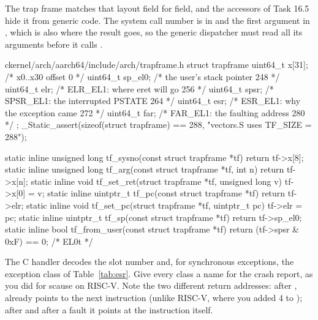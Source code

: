 \documentclass[11pt,a4paper]{article}
\begin{document}
The trap frame matches that layout field for field, and the accessors of Task 16.5 hide it from generic code.
The system call number is in  and the first argument in , which is also where the result goes, so
the generic dispatcher must read all its arguments before it calls .

\begin{lst}{c}{kernel/arch/aarch64/include/arch/trapframe.h}
struct trapframe {
    uint64_t x[31];             /* x0..x30                     offset   0 */
    uint64_t sp_el0;            /* the user's stack pointer           248 */
    uint64_t elr;               /* ELR_EL1: where eret will go        256 */
    uint64_t spsr;              /* SPSR_EL1: the interrupted PSTATE   264 */
    uint64_t esr;               /* ESR_EL1: why the exception came    272 */
    uint64_t far;               /* FAR_EL1: the faulting address      280 */
};
_Static_assert(sizeof(struct trapframe) == 288, "vectors.S uses TF_SIZE = 288");

static inline unsigned long tf_sysno(const struct trapframe *tf)         { return tf->x[8]; }
static inline unsigned long tf_arg(const struct trapframe *tf, int n)    { return tf->x[n]; }
static inline void tf_set_ret(struct trapframe *tf, unsigned long v)     { tf->x[0] = v; }
static inline uintptr_t tf_pc(const struct trapframe *tf)                { return tf->elr; }
static inline void tf_set_pc(struct trapframe *tf, uintptr_t pc)         { tf->elr = pc; }
static inline uintptr_t tf_sp(const struct trapframe *tf)                { return tf->sp_el0; }
static inline bool tf_from_user(const struct trapframe *tf) { return (tf->spsr & 0xF) == 0; } /* EL0t */
\end{lst}

The C handler decodes the slot number and, for synchronous exceptions, the exception class of
Table~\ref{tab:esr}. Give every class a name for the crash report, as you did for scause on RISC-V. Note the two
different return addresses: after ,  already points to the next instruction (unlike RISC-V,
where you added 4 to ); after  and after a fault it points at the instruction itself.
\end{document}
